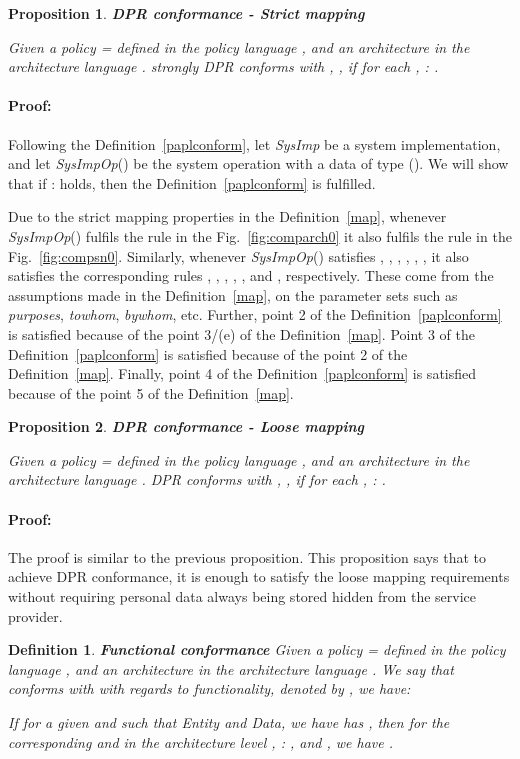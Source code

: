 \documentclass[a4paper]{article}
\newtheorem{ttd}{Definition}
\newtheorem{ttpp}{Proposition}
\newenvironment{proof}{\paragraph{Proof:}}{\hfill}
\begin{document}
\begin{ttpp}\label{prop:1} \textbf{DPR conformance - Strict mapping}

\noindent Given a policy  =  defined in the policy language , and an   
architecture  in the architecture language .   strongly DPR conforms with  ,   , if for each   ,  :   .
\end{ttpp}
\begin{proof}
Following  the Definition~\ref{paplconform}, let \textit{SysImp} be a system implementation, and let  \textit{SysImpOp}() be the system operation with a data  of type  ().  
We will show that if  :    holds, then the Definition~\ref{paplconform} is fulfilled.

Due to the strict mapping properties in the Definition~\ref{map}, whenever \textit{SysImpOp}() fulfils the rule  in the Fig.~\ref{fig:comparch0} it also fulfils the rule  in the Fig.~\ref{fig:compsn0}. Similarly, whenever \textit{SysImpOp}() satisfies , , ,  , , , it also satisfies the corresponding rules , ,  ,  , , and , respectively.    These come from the assumptions made in the Definition~\ref{map}, on the parameter sets such as \textit{purposes}, \textit{towhom}, \textit{bywhom}, etc. Further, point 2 of the Definition~\ref{paplconform} is satisfied because of the point 3/(e) of the Definition~\ref{map}. Point 3 of the Definition~\ref{paplconform} is satisfied because of the point 2 of the Definition~\ref{map}. Finally,  point 4 of the Definition~\ref{paplconform} is satisfied because of the point 5 of the Definition~\ref{map}. 
\end{proof}

\begin{ttpp}\label{prop:2} \textbf{DPR conformance - Loose mapping}

\noindent Given a policy  =  defined in the policy language , and an   
architecture  in the architecture language .   DPR conforms with  ,   , if for each   ,  :   .
\end{ttpp}
\begin{proof}
The proof is similar to the previous proposition. This proposition says that to achieve DPR conformance, it is enough to satisfy the loose mapping requirements without requiring personal data always being stored hidden from the service provider. 
\end{proof}

\begin{ttd}\label{func} \textbf{Functional conformance}
Given a policy  =  defined in the policy language , and an   
architecture  in the architecture language . We say that  conforms with  with regards to functionality, denoted by    ,  we have:

If for a given  and  such that   \textit{Entity} and   \textit{Data}, we have  has , then for the corresponding  and   in the architecture level  , :   ,  and    , we have .  

\end{ttd} 
\end{document}
